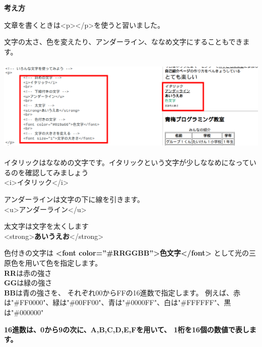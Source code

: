 \documentclass[a4paper,12pt]{jarticle}
\begin{document}
\bigskip

\flushleft
\textbf{考え方}



文章を書くときは{\textless}p{\textgreater}{\textless}/p{\textgreater}を使うと習いました。

文字の太さ、色を変えたり、アンダーライン、ななめ文字にすることもできます。

\centering
\includegraphics[width=14.284cm,height=4.427cm]{textbook-img186.png}

\bigskip

\flushleft

イタリックはななめの文字です。イタリックという文字が少しななめになっているのを確認してみましょう\\
{\textless}i{\textgreater}イタリック{\textless}/i{\textgreater}\\

\bigskip

アンダーラインは文字の下に線を引きます。\\
{\textless}u{\textgreater}アンダーライン{\textless}/u{\textgreater}\\

\bigskip

太文字は文字を太くします\\
{\textless}strong{\textgreater}\textbf{あいうえお}{\textless}/strong{\textgreater}


\bigskip
色付きの文字は
\textbf{{\textless}font color=”\#RRGGBB”{\textgreater}色文字{\textless}/font{\textgreater}}
として光の三原色を用いて色を指定します。\\
\textbf{RR}は赤の強さ\\
\textbf{GG}は緑の強さ\\
\textbf{BB}は青の強さを、
それぞれ00からFFの16進数で指定します。
例えば、赤は"\#FF0000"、緑は"\#00FF00"、青は"\#0000FF"、白は"\#FFFFFF"、黒は"\#000000"

\bigskip
\textbf{16進数は、0から9の次に、A,B,C,D,E,Fを用いて、
  1桁を16個の数値で表します。}

\bigskip
\end{document}
